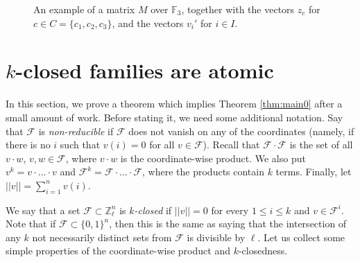 \begin{figure}
		\caption{An example of a matrix $M$ over $\mathbb{F}_3$, together with the vectors $z_{c}$ for $c\in C=\{c_1,c_2,c_3\}$, and the vectors $v_{i}'$ for $i\in I$.}
		\label{fig3}
	\end{figure}
	
	
	
	\section{\texorpdfstring{$k$}{k}-closed families are atomic}
	
	In this section, we prove a theorem which implies Theorem \ref{thm:main0} after a small amount of work. Before stating it, we need some additional notation.  Say that $\mathcal{F}$ is \emph{non-reducible} if $\mathcal{F}$ does not vanish on any of the coordinates (namely, if there is no $i$ such that $v(i) = 0$ for all $v \in \mathcal{F}$). Recall that $\mathcal{F} \cdot \mathcal{F}$ is the set of all $v \cdot w$, $v,w \in \mathcal{F}$, where $v \cdot w$ is the coordinate-wise product. We also put $v^k = v \cdot \dotsc\cdot v$ and $\mathcal{F}^{k}=\mathcal{F}\cdot \dotsc \cdot \mathcal{F}$, where the products contain $k$ terms. Finally, let $||v||=\sum_{i=1}^{n}v(i)$. 
	
	We say that a set $\mathcal{F}\subset \mathbb{Z}^{n}_{\ell}$ is \emph{$k$-closed} if $||v||=0$ for every $1\leq i\leq k$ and $v\in \mathcal{F}^{i}$. Note that if $\mathcal{F} \subset \{0,1\}^n$, then this is the same as saying that the intersection of any $k$ not necessarily distinct sets from $\mathcal{F}$ is divisible by $\ell$.  Let us collect some simple properties of the coordinate-wise product and $k$-closedness.
	
